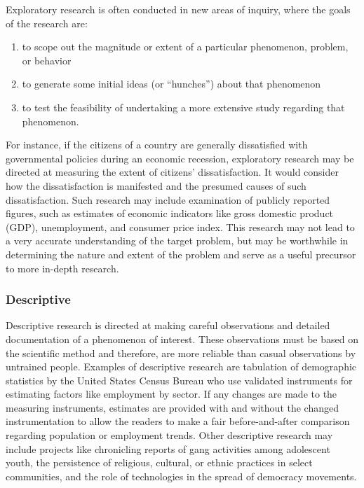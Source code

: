 Exploratory research is often conducted in new areas of inquiry, where the goals of the research are: 

\begin{enumerate}
	\item to scope out the magnitude or extent of a particular phenomenon, problem, or behavior
	\item to generate some initial ideas (or ``hunches'') about that phenomenon
	\item to test the feasibility of undertaking a more extensive study regarding that phenomenon. 
\end{enumerate}

For instance, if the citizens of a country are generally dissatisfied with governmental policies during an economic recession, exploratory research may be directed at measuring the extent of citizens' dissatisfaction. It would consider how the dissatisfaction is manifested and the presumed causes of such dissatisfaction. Such research may include examination of publicly reported figures, such as estimates of economic indicators like gross domestic product (GDP), unemployment, and consumer price index. This research may not lead to a very accurate understanding of the target problem, but may be worthwhile in determining the nature and extent of the problem and serve as a useful precursor to more in-depth research.

\subsubsection{Descriptive}

Descriptive research is directed at making careful observations and detailed documentation of a phenomenon of interest. These observations must be based on the scientific method and therefore, are more reliable than casual observations by untrained people. Examples of descriptive research are tabulation of demographic statistics by the United States Census Bureau who use validated instruments for estimating factors like employment by sector. If any changes are made to the measuring instruments, estimates are provided with and without the changed instrumentation to allow the readers to make a fair before-and-after comparison regarding population or employment trends. Other descriptive research may include projects like chronicling reports of gang activities among adolescent youth, the persistence of religious, cultural, or ethnic practices in select communities, and the role of technologies in the spread of democracy movements.

